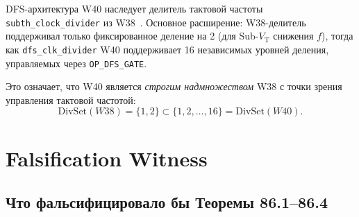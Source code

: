DFS-архитектура W40 наследует делитель тактовой частоты
\texttt{subth\_clock\_divider} из W38~\cite{trinity-fpga137}.
Основное расширение: W38-делитель поддерживал только фиксированное
деление на 2 (для Sub-$V_{\mathrm{T}}$ снижения $f$), тогда как
\texttt{dfs\_clk\_divider} W40 поддерживает 16 независимых уровней
деления, управляемых через \texttt{OP\_DFS\_GATE}.

Это означает, что W40 является \emph{строгим надмножеством} W38
с точки зрения управления тактовой частотой:
\[
  \mathrm{DivSet}(W38) = \{1, 2\} \subset \{1, 2, \ldots, 16\} = \mathrm{DivSet}(W40).
\]

\section{Falsification Witness}
\label{sec:glava86-falsification}

\subsection{Что фальсифицировало бы Теоремы 86.1--86.4}
\label{subsec:falsif-what}

